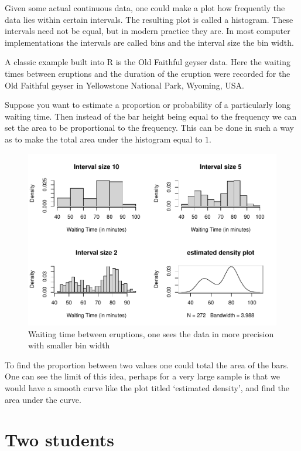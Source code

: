 \documentclass[
]{book}
\theoremstyle{definition}
\theoremstyle{definition}
\theoremstyle{definition}
\theoremstyle{definition}
\theoremstyle{remark}
\begin{document}
Given some actual continuous data, one could make a plot how frequently the data lies within certain intervals. The resulting plot is called a histogram. These intervals need not be equal, but in modern practice they are. In most computer implementations the intervals are called bins and the interval size the bin width.

A classic example built into R is the Old Faithful geyser data. Here the waiting times between eruptions and the duration of the eruption were recorded for the Old Faithful geyser in Yellowstone National Park, Wyoming, USA.

Suppose you want to estimate a proportion or probability of a particularly long waiting time. Then instead of the bar height being equal to the frequency we can set the area to be proportional to the frequency. This can be done in such a way as to make the total area under the histogram equal to \(1\).

\begin{figure}
\centering
\includegraphics{6G4Z3008-notes_files/figure-latex/faithful-1.pdf}
\caption{\label{fig:faithful}Waiting time between eruptions, one sees the data in more precision with smaller bin width}
\end{figure}

To find the proportion between two values one could total the area of the bars. One can see the limit of this idea, perhaps for a very large sample is that we would have a smooth curve like the plot titled `estimated density', and find the area under the curve.

\hypertarget{two-students}{%
\section{Two students}\label{two-students}}
\end{document}
